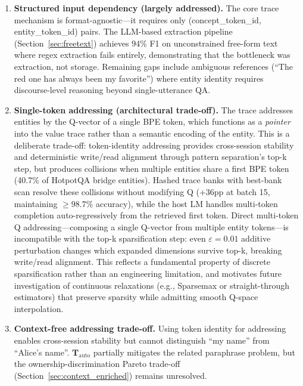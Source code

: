 \documentclass[11pt,a4paper]{article}
\begin{document}
\begin{enumerate}[leftmargin=*]
  \item \textbf{Structured input dependency (largely addressed).} The core trace mechanism is format-agnostic---it requires only (concept\_token\_id, entity\_token\_id) pairs. The LLM-based extraction pipeline (Section~\ref{sec:freetext}) achieves 94\% F1 on unconstrained free-form text where regex extraction fails entirely, demonstrating that the bottleneck was extraction, not storage. Remaining gaps include ambiguous references (``The red one has always been my favorite'') where entity identity requires discourse-level reasoning beyond single-utterance QA.

  \item \textbf{Single-token addressing (architectural trade-off).} The trace addresses entities by the Q-vector of a single BPE token, which functions as a \emph{pointer} into the value trace rather than a semantic encoding of the entity. This is a deliberate trade-off: token-identity addressing provides cross-session stability and deterministic write/read alignment through pattern separation's top-k step, but produces collisions when multiple entities share a first BPE token (40.7\% of HotpotQA bridge entities). Hashed trace banks with best-bank scan resolve these collisions without modifying Q (+36pp at batch 15, maintaining ${\geq}98.7\%$ accuracy), while the host LM handles multi-token completion auto-regressively from the retrieved first token. Direct multi-token Q addressing---composing a single Q-vector from multiple entity tokens---is incompatible with the top-k sparsification step: even $\varepsilon{=}0.01$ additive perturbation changes which expanded dimensions survive top-k, breaking write/read alignment. This reflects a fundamental property of discrete sparsification rather than an engineering limitation, and motivates future investigation of continuous relaxations (e.g., Sparsemax or straight-through estimators) that preserve sparsity while admitting smooth Q-space interpolation.

  \item \textbf{Context-free addressing trade-off.} Using token identity for addressing enables cross-session stability but cannot distinguish ``my name'' from ``Alice's name''. $\mathbf{T}_{\text{auto}}$ partially mitigates the related paraphrase problem, but the ownership-discrimination Pareto trade-off (Section~\ref{sec:context_enriched}) remains unresolved.


\end{enumerate}
\end{document}
